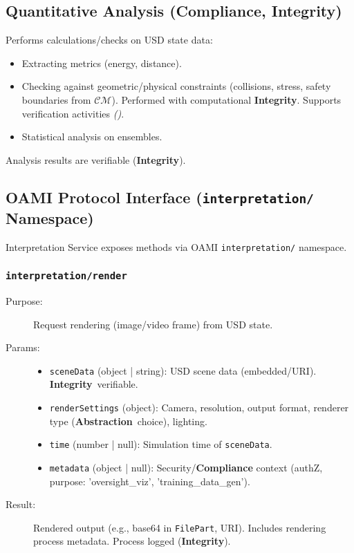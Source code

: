 \documentclass[12pt,a4paper]{report}
\renewcommand{\citep}[1]{\textit{\scriptsize{(\cite{#1})}}}
\newcommand{\Integrity}{\textbf{Integrity}}
\newcommand{\Abstraction}{\textbf{Abstraction}}
\begin{document}
	\subsection{Quantitative Analysis (\textbf{Compliance}, \Integrity)}
	\label{app:oasim_quant_analysis}
	Performs calculations/checks on USD state data:
	\begin{itemize}
		\item Extracting metrics (energy, distance).
		\item Checking against geometric/physical constraints (collisions, stress, safety boundaries from $\mathcal{CM}$). Performed with computational \Integrity. Supports verification activities \citep{Josifovski_SCDA_2025}.
		\item Statistical analysis on ensembles.
	\end{itemize}
	Analysis results are verifiable (\Integrity).
	
	\subsection{OAMI Protocol Interface (\texttt{interpretation/} Namespace)}
	\label{app:oasim_interp_interface}
	
	Interpretation Service exposes methods via OAMI \texttt{interpretation/} namespace.
	
	\subsubsection{\texttt{interpretation/render}}
	\label{app:oasim_interp_render}
	\begin{description}
		\item[Purpose:] Request rendering (image/video frame) from USD state.
		\item[Params:]
		\begin{itemize} \itemsep0em
			\item \texttt{sceneData} (object | string): USD scene data (embedded/URI). \Integrity\ verifiable.
			\item \texttt{renderSettings} (object): Camera, resolution, output format, renderer type (\Abstraction\ choice), lighting.
			\item \texttt{time} (number | null): Simulation time of \texttt{sceneData}.
			\item \texttt{metadata} (object | null): Security/\textbf{Compliance} context (authZ, purpose: 'oversight\_viz', 'training\_data\_gen').
		\end{itemize}
		\item[Result:] Rendered output (e.g., base64 in \texttt{FilePart}, URI). Includes rendering process metadata. Process logged (\Integrity).
	\end{description}
	
\end{document}
